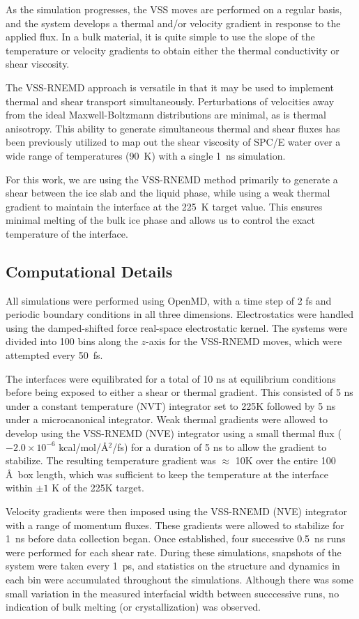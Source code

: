 \documentclass[11pt]{article}
\begin{document}
\begin{doublespace}
As the simulation progresses, the VSS moves are performed on a regular
basis, and the system develops a thermal and/or velocity gradient in
response to the applied flux.  In a bulk material, it is quite simple
to use the slope of the temperature or velocity gradients to obtain
either the thermal conductivity or shear viscosity.

The VSS-RNEMD approach is versatile in that it may be used to
implement thermal and shear transport simultaneously.  Perturbations
of velocities away from the ideal Maxwell-Boltzmann distributions are
minimal, as is thermal anisotropy.  This ability to generate
simultaneous thermal and shear fluxes has been previously utilized to
map out the shear viscosity of SPC/E water over a wide range of
temperatures (90~K) with a single 1~ns simulation.\cite{Kuang12}

For this work, we are using the VSS-RNEMD method primarily to generate
a shear between the ice slab and the liquid phase, while using a weak
thermal gradient to maintain the interface at the 225~K target
value. This ensures minimal melting of the bulk ice phase and allows
us to control the exact temperature of the interface.

\subsection{Computational Details}
All simulations were performed using OpenMD,\cite{OOPSE,openmd} with a
time step of 2 fs and periodic boundary conditions in all three
dimensions.  Electrostatics were handled using the damped-shifted
force real-space electrostatic kernel.\cite{Ewald} The systems were
divided into 100 bins along the $z$-axis for the VSS-RNEMD moves,
which were attempted every 50~fs. 

The interfaces were equilibrated for a total of 10 ns at equilibrium
conditions before being exposed to either a shear or thermal gradient.
This consisted of 5 ns under a constant temperature (NVT) integrator
set to 225K followed by 5 ns under a microcanonical integrator.  Weak
thermal gradients were allowed to develop using the VSS-RNEMD (NVE)
integrator using a small thermal flux ($-2.0\times 10^{-6}$
kcal/mol/\AA$^2$/fs) for a duration of 5 ns to allow the gradient to
stabilize.  The resulting temperature gradient was $\approx$ 10K over
the entire 100 \AA\  box length, which was sufficient to keep the
temperature at the interface within $\pm 1$ K of the 225K target.

Velocity gradients were then imposed using the VSS-RNEMD (NVE)
integrator with a range of momentum fluxes.  These gradients were
allowed to stabilize for 1~ns before data collection began. Once
established, four successive 0.5~ns runs were performed for each shear
rate.  During these simulations, snapshots of the system were taken
every 1~ps, and statistics on the structure and dynamics in each bin
were accumulated throughout the simulations.  Although there was some
small variation in the measured interfacial width between succcessive
runs, no indication of bulk melting (or crystallization) was observed.


\end{doublespace}
\end{document}
